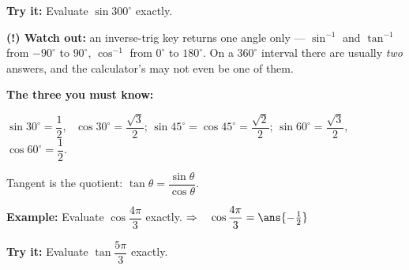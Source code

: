 \documentclass[12pt]{article}
\begin{document}
\begin{tryitbox}
\textbf{Try it:} \quad Evaluate $\sin 300^\circ$ exactly.\\[2pt]
\end{tryitbox}

\begin{watchoutbox}
\textbf{(!) Watch out:} an inverse-trig key returns one angle only --- $\sin^{-1}$ and $\tan^{-1}$ from $-90^\circ$ to $90^\circ$, $\cos^{-1}$ from $0^\circ$ to $180^\circ$. On a $360^\circ$ interval there are usually \emph{two} answers, and the calculator's may not even be one of them.
\end{watchoutbox}


\begin{formulabox}
\textbf{The three you must know:}\par
$\sin 30^\circ = \dfrac{1}{2}$, \ $\cos 30^\circ = \dfrac{\sqrt{3}}{2}$; \quad $\sin 45^\circ = \cos 45^\circ = \dfrac{\sqrt{2}}{2}$; \quad $\sin 60^\circ = \dfrac{\sqrt{3}}{2}$, \ $\cos 60^\circ = \dfrac{1}{2}$.\par
Tangent is the quotient: $\tan\theta = \dfrac{\sin\theta}{\cos\theta}$.
\end{formulabox}

\begin{examplebox}
\textbf{Example:} \quad Evaluate $\cos\dfrac{4\pi}{3}$ exactly.
$\Rightarrow\quad \cos\dfrac{4\pi}{3} = \ans{-\tfrac{1}{2}}$
\end{examplebox}

\begin{tryitbox}
\textbf{Try it:} \quad Evaluate $\tan\dfrac{5\pi}{3}$ exactly.\\[2pt]
\end{tryitbox}
\end{document}
